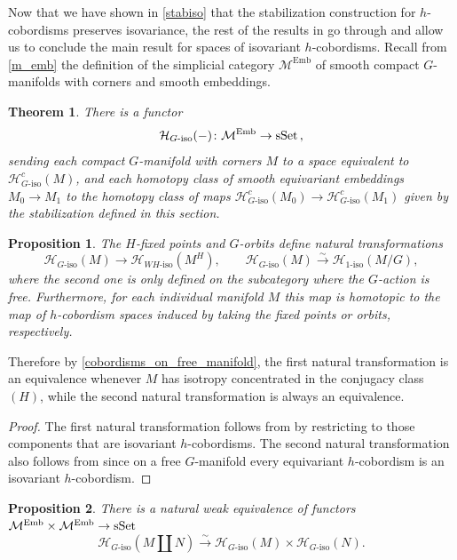 \documentclass[11pt]{amsart}
\newtheorem{thm}{Theorem}[section]
\newtheorem{prop}{Proposition}[section]
\theoremstyle{definition}
\numberwithin{equation}{section}
\numberwithin{figure}{section}
\newcommand{\ra}{\longrightarrow}
\newcommand{\simar}{\overset\sim\longrightarrow}
\newcommand{\mc}{\mathcal}
\newcommand{\sSet}{\textup{sSet}}
\newcommand{\Man}{\mc M^\mathrm{Emb}}
\newcommand{\dashiso}{\textrm{-}\mathrm{iso}}
\begin{document}
Now that we have shown in \autoref{stabiso} that the stabilization construction for $h$-cobordisms preserves isovariance, the rest of the results in \cite{GIMM1} go through and allow us to conclude the main result \cite[Theorem 6.18]{GIMM1} for spaces of isovariant $h$-cobordisms. Recall from \autoref{m_emb} the definition of the simplicial category $\Man$ of smooth compact $G$-manifolds with corners and smooth embeddings.

\begin{thm}\label{functor}
There is a functor $$\mc H_{G\dashiso} (-)\colon \Man \to \sSet\, ,$$ sending each compact $G$-manifold with corners $M$ to a space equivalent to $\mc H_{G\dashiso}^c(M)$, and each homotopy class of smooth equivariant embeddings $M_0 \to M_1$ to the homotopy class of maps $\mc H_{G\dashiso}^c(M_0) \to \mc H_{G\dashiso}^c(M_1)$ given by the stabilization defined in this section.
\end{thm}

\begin{prop}\label{stabilization_commutes_with_fixed_points}\label{stabilization_commutes_with_orbits}
	The $H$-fixed points and $G$-orbits define natural transformations
	\[ \mc H_{G\dashiso}(M) \ra \mc H_{WH\dashiso}(M^H), \qquad \mc H_{G\dashiso}(M) \simar \mc H_{1\dashiso}(M/G), \]
	where the second one is only defined on the subcategory where the $G$-action is free. Furthermore, for each individual manifold $M$ this map is homotopic to the map of $h$-cobordism spaces induced by taking the fixed points or orbits, respectively.
\end{prop}

Therefore by \autoref{cobordisms_on_free_manifold}, the first natural transformation is an equivalence whenever $M$ has isotropy concentrated in the conjugacy class $(H)$, while the second natural transformation is always an equivalence.

\begin{proof}
	The first natural transformation follows from \cite[Corollary 6.22]{GIMM1} by restricting to those components that are isovariant $h$-cobordisms. The second natural transformation also follows from \cite[Corollary 6.22]{GIMM1} since on a free $G$-manifold every equivariant $h$-cobordism is an isovariant $h$-cobordism.
\end{proof}

\begin{prop}\label{stabilization_commutes_with_coproducts}
	There is a natural weak equivalence of functors $\Man \times \Man \to \sSet$
	\[ \mc H_{G\dashiso}(M \amalg N) \simar \mc H_{G\dashiso}(M) \times \mc H_{G\dashiso}(N). \]
\end{prop}
\end{document}
